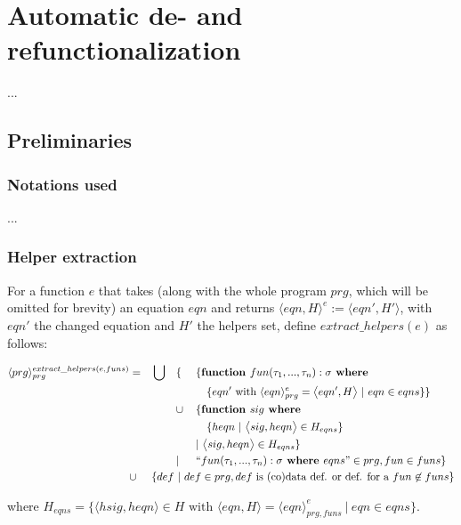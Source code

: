 \chapter{Automatic de- and refunctionalization}

...

\section{Preliminaries}

\subsection{Notations used}

...

\subsection{Helper extraction}

For a function $e$ that takes (along with the whole program $prg$, which will be omitted for brevity) an equation $eqn$ and returns $\langle eqn, H \rangle^e := \big\langle eqn', H' \big\rangle$, with $eqn'$ the changed equation and $H'$ the helpers set, define $extract\_helpers(e)$ as follows:

\begin{alignat*}{4}
\langle prg \rangle^{extract\_helpers(e, funs)}_{prg} & = &&\bigcup &&\{ ~&&\{ \textrm{\textbf{function }} fun(\tau_1, ..., \tau_n): \sigma \textrm{\textbf{ where }} \\
& && && &&\quad \{ eqn' \textrm{ with } \langle eqn \rangle^{e}_{prg} = \big\langle eqn', H \big\rangle ~ | ~ eqn \in eqns \} \} \\
& && && \cup && \{ \textrm{\textbf{function }} sig \textrm{\textbf{ where }} \\
& && && &&\quad \{ heqn ~ | ~ \big\langle sig, heqn \big\rangle \in H_{eqns} \} \\
& && && && | ~  \big\langle sig, heqn \big\rangle \in H_{eqns} \} \\
& && && | && `` fun (\tau_1, ..., \tau_n): \sigma \textrm{\textbf{ where }} eqns " \in prg, fun \in funs \} \\
& \cup && \{ def ~ | ~ def \in prg, def \textrm{ is (co)data def. or def. for a } fun \not\in funs \} \span\span\span\span
\end{alignat*}

where $H_{eqns} = \{ \big\langle hsig, heqn \big\rangle \in H \textrm{ with } \big\langle eqn, H \big\rangle = \langle eqn \rangle^{e}_{prg, funs} ~ | ~ eqn \in eqns \}$.

